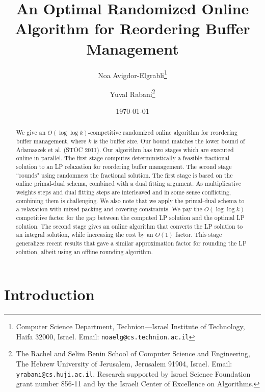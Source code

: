 \documentclass[12pt]{article}
\begin{document}
\title{An Optimal Randomized Online Algorithm for Reordering Buffer Management}



\author{
Noa Avigdor-Elgrabli\thanks{Computer Science Department,
Technion---Israel Institute of Technology, Haifa 32000, Israel.
Email: {\tt noaelg@cs.technion.ac.il}}
\and
Yuval Rabani\thanks{The Rachel and Selim Benin School of 
Computer Science and Engineering, The Hebrew University of Jerusalem,
Jerusalem 91904, Israel. Email: {\tt yrabani@cs.huji.ac.il}. Research
supported by Israel Science Foundation grant number 856-11 and
by the Israeli Center of Excellence on Algorithms.}
}

\date{\today}

\setcounter{footnote}{3}
\maketitle

\begin{abstract}
We give an $O(\log\log k)$-competitive randomized online
algorithm for reordering buffer management, where $k$ is the
buffer size. Our bound matches the lower bound of
Adamaszek et al. (STOC 2011). Our algorithm has two stages
which are executed online in parallel. The first stage computes
deterministically a feasible fractional solution to an LP relaxation 
for reordering buffer management. The second stage ``rounds" 
using randomness the fractional solution. The first stage 
is based on the online primal-dual schema, combined with a 
dual fitting argument. As multiplicative weights steps and dual
fitting steps are interleaved and in some sense conflicting, 
combining them is challenging. We also note that we apply
the primal-dual schema to a relaxation with mixed packing
and covering constraints. We pay the $O(\log\log k)$ competitive 
factor for the gap between the computed LP solution and the
optimal LP solution. The second stage
gives an online algorithm that converts the LP solution to
an integral solution, while increasing the cost by an $O(1)$ 
factor. This stage generalizes recent results that gave a
similar approximation factor for rounding the LP solution, 
albeit using an offline rounding algorithm.
\end{abstract}



\section{Introduction}
\end{document}
